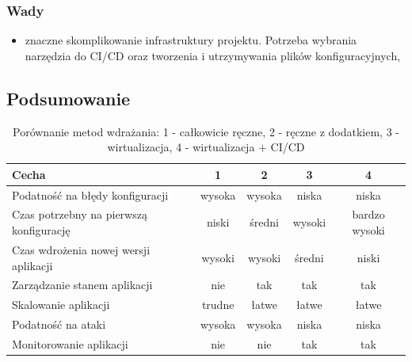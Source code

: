 \documentclass{article}
\begin{document}
\subsubsection{Wady}

\begin{itemize}
    \item znaczne skomplikowanie infrastruktury projektu. Potrzeba wybrania narzędzia do CI/CD oraz tworzenia i utrzymywania plików konfiguracyjnych,
\end{itemize}

\subsection{Podsumowanie}

\begin{table}[H]
\centering
\begin{tabular}{|l|c|c|c|c|}
\hline
\textbf{Cecha} & \textbf{1} & \textbf{2} & \textbf{3} & \textbf{4} \\ \hline
Podatność na błędy konfiguracji         & \cellcolor{red!50}wysoka & \cellcolor{red!50}wysoka & \cellcolor{green!50}niska & \cellcolor{green!50}niska \\ \hline
Czas potrzebny na pierwszą konfigurację & \cellcolor{green!50}niski & \cellcolor{yellow!50}średni & \cellcolor{red!50}wysoki & \cellcolor{red!50}bardzo wysoki \\ \hline
Czas wdrożenia nowej wersji aplikacji   & \cellcolor{red!50}wysoki & \cellcolor{red!50}wysoki & \cellcolor{yellow!50}średni & \cellcolor{green!50}niski \\ \hline
Zarządzanie stanem aplikacji            & \cellcolor{red!50}nie & \cellcolor{green!50}tak & \cellcolor{green!50}tak & \cellcolor{green!50}tak \\ \hline
Skalowanie aplikacji                    & \cellcolor{red!50}trudne & \cellcolor{green!50}łatwe & \cellcolor{green!50}łatwe & \cellcolor{green!50}łatwe \\ \hline
Podatność na ataki                      & \cellcolor{red!50}wysoka & \cellcolor{red!50}wysoka & \cellcolor{green!50}niska & \cellcolor{green!50}niska \\ \hline
Monitorowanie aplikacji                 & \cellcolor{red!50}nie & \cellcolor{red!50}nie & \cellcolor{green!50}tak & \cellcolor{green!50}tak \\ \hline
\end{tabular}
\caption{Porównanie metod wdrażania: 1 - całkowicie ręczne, 2 - ręczne z dodatkiem, 3 - wirtualizacja, 4 - wirtualizacja + CI/CD}
\label{tab:porownanie-metod-wdrazania}
\end{table}
\end{document}
